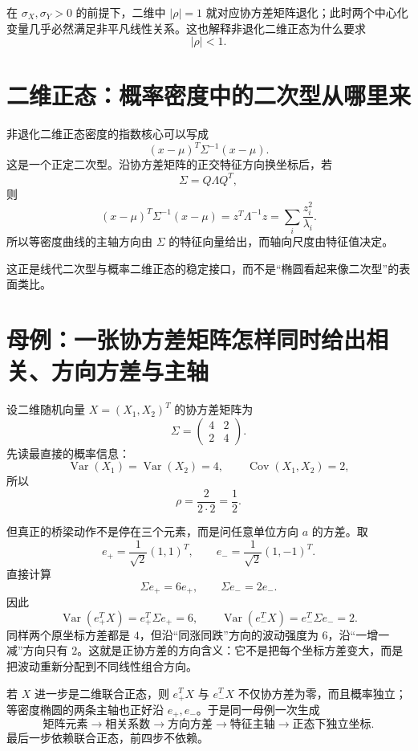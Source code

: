 \documentclass[profile=standard]{ipara-handbook}
\begin{document}
在 $\sigma_X,\sigma_Y>0$ 的前提下，二维中 $\lvert\rho\rvert=1$ 就对应协方差矩阵退化；此时两个中心化变量几乎必然满足非平凡线性关系。这也解释非退化二维正态为什么要求
\[
\lvert\rho\rvert<1.
\]

\section{二维正态：概率密度中的二次型从哪里来}
非退化二维正态密度的指数核心可以写成
\[
(x-\mu)^T\Sigma^{-1}(x-\mu).
\]
这是一个正定二次型。沿协方差矩阵的正交特征方向换坐标后，若
\[
\Sigma=Q\Lambda Q^T,
\]
则
\[
(x-\mu)^T\Sigma^{-1}(x-\mu)
=z^T\Lambda^{-1}z
=\sum_i\frac{z_i^2}{\lambda_i}.
\]
所以等密度曲线的主轴方向由 $\Sigma$ 的特征向量给出，而轴向尺度由特征值决定。

这正是线代二次型与概率二维正态的稳定接口，而不是“椭圆看起来像二次型”的表面类比。

\section{母例：一张协方差矩阵怎样同时给出相关、方向方差与主轴}
设二维随机向量 $X=(X_1,X_2)^T$ 的协方差矩阵为
\[
\Sigma=
\begin{pmatrix}
4&2\\
2&4
\end{pmatrix}.
\]
先读最直接的概率信息：
\[
\operatorname{Var}(X_1)=\operatorname{Var}(X_2)=4,
\qquad
\operatorname{Cov}(X_1,X_2)=2,
\]
所以
\[
\rho=\frac{2}{2\cdot2}=\frac12.
\]

但真正的桥梁动作不是停在三个元素，而是问任意单位方向 $a$ 的方差。取
\[
e_+=\frac1{\sqrt2}(1,1)^T,
\qquad
e_- =\frac1{\sqrt2}(1,-1)^T.
\]
直接计算
\[
\Sigma e_+=6e_+,
\qquad
\Sigma e_-=2e_-.
\]
因此
\[
\operatorname{Var}(e_+^TX)=e_+^T\Sigma e_+=6,
\qquad
\operatorname{Var}(e_-^TX)=e_-^T\Sigma e_-=2.
\]
同样两个原坐标方差都是 $4$，但沿“同涨同跌”方向的波动强度为 $6$，沿“一增一减”方向只有 $2$。这就是正协方差的方向含义：它不是把每个坐标方差变大，而是把波动重新分配到不同线性组合方向。

若 $X$ 进一步是二维联合正态，则 $e_+^TX$ 与 $e_-^TX$ 不仅协方差为零，而且概率独立；等密度椭圆的两条主轴也正好沿 $e_+,e_-$。于是同一母例一次生成
\[
\boxed{
\text{矩阵元素}
\longrightarrow
\text{相关系数}
\longrightarrow
\text{方向方差}
\longrightarrow
\text{特征主轴}
\longrightarrow
\text{正态下独立坐标}.
}
\]
最后一步依赖联合正态，前四步不依赖。
\end{document}

